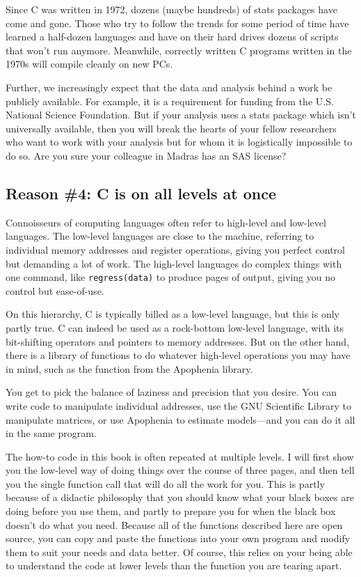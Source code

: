 {Since C was written in 1972, dozens (maybe hundreds) of stats packages
have come and gone. Those who try to follow the trends for some period of
time have learned a half-dozen languages and have on their hard drives
dozens of scripts that won't run anymore.  Meanwhile, correctly written
C programs written in the 1970s will compile cleanly on new PCs.

Further, we increasingly
expect that the data and analysis behind a work be publicly available.
For example, it is a requirement for funding from the U.S. National
Science Foundation. But if your analysis uses a stats package which
isn't universally available, then you will break the hearts of 
your fellow researchers who want to work with your analysis but for whom
it is logistically impossible to do so. Are you sure your colleague in
Madras has an SAS license?


\ifbook
\subsection{Reason \#4: C is on all levels at once} 
Connoisseurs of computing languages often refer to high-level and
low-level languages. The low-level languages are close to the machine,
referring to individual memory addresses and register operations,
giving you perfect control but demanding a lot of work. The high-level
languages do complex things with one command, like {\tt regress(data)}
to produce pages of output, giving you no control but ease-of-use.

On this hierarchy, C is typically billed as a low-level language,
but this is only partly true. C can indeed be used as a rock-bottom
low-level language, with its bit-shifting operators and pointers to
memory addresses.  But on the other hand, there is a library of functions
to do whatever high-level operations you may have in mind, such as the
 function from the Apophenia library.

You get to pick the balance of laziness and precision that you desire. You
can write code to manipulate individual addresses, use the GNU Scientific
Library to manipulate matrices, or use Apophenia to estimate models---and
you can do it all in the same program.

The how-to code in this book is often repeated at multiple levels. I will first
show you the low-level way of doing things over the course of three
pages, and then tell you the single function call that will do all the work
for you. This is partly because of a didactic philosophy that you should
know what your black boxes are doing before you use them, and partly
to prepare you for when the black box doesn't do what you need. Because all of the
functions described here are open source, you can copy and paste the
functions into your own program and modify them to suit your needs
and data better. Of course, this relies on your being able to understand
the code at lower levels than the function you are tearing apart.
\fi
}
